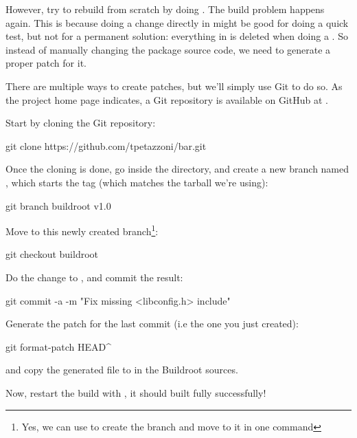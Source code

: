 However, try to rebuild  from scratch by doing . The build problem happens again. This is because
doing a change directly in  might be good for
doing a quick test, but not for a permanent solution: everything in
 is deleted when doing a . So instead of
manually changing the package source code, we need to generate a
proper patch for it.

There are multiple ways to create patches, but we'll simply use Git to
do so. As the  project home page indicates, a Git repository
is available on GitHub at .

Start by cloning the Git repository:

\begin{bashinput}
git clone https://github.com/tpetazzoni/bar.git
\end{bashinput}

Once the cloning is done, go inside the  directory, and
create a new branch named , which starts the
 tag (which matches the  tarball we're
using):

\begin{bashinput}
git branch buildroot v1.0
\end{bashinput}

Move to this newly created branch\footnote{Yes, we can use  to create the branch and move to it in one command}:

\begin{bashinput}
git checkout buildroot
\end{bashinput}

Do the  change to , and
commit the result:

\begin{bashinput}
git commit -a -m "Fix missing <libconfig.h> include"
\end{bashinput}

Generate the patch for the last commit (i.e the one you just created):

\begin{bashinput}
git format-patch HEAD^
\end{bashinput}

and copy the generated  file to 
in the Buildroot sources.

Now, restart the build with , it should
built fully successfully!

